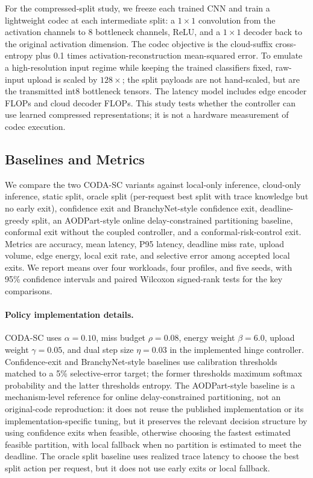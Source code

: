 \documentclass[11pt]{article}
\begin{document}
For the compressed-split study, we freeze each trained CNN and train a lightweight
codec at each intermediate split: a $1\times1$ convolution from the activation
channels to 8 bottleneck channels, ReLU, and a $1\times1$ decoder back to the
original activation dimension. The codec objective is the cloud-suffix
cross-entropy plus 0.1 times activation-reconstruction mean-squared error. To
emulate a high-resolution input regime while keeping the trained classifiers
fixed, raw-input upload is scaled by $128\times$; the split payloads are not
hand-scaled, but are the transmitted int8 bottleneck tensors. The latency model
includes edge encoder FLOPs and cloud decoder FLOPs. This study tests whether
the controller can use learned compressed representations; it is not a hardware
measurement of codec execution.

\subsection{Baselines and Metrics}

We compare the two CODA-SC variants against local-only inference, cloud-only
inference, static split, oracle split (per-request best split with trace
knowledge but no early exit), confidence exit and BranchyNet-style confidence
exit, deadline-greedy split, an AODPart-style online delay-constrained
partitioning baseline, conformal exit without the coupled controller, and a
conformal-risk-control exit. Metrics are accuracy, mean latency, P95 latency,
deadline miss rate, upload volume, edge energy, local exit rate, and selective
error among accepted local exits. We report means over four workloads, four
profiles, and five seeds, with 95\% confidence intervals and paired Wilcoxon
signed-rank tests for the key comparisons.

\paragraph{Policy implementation details.}
CODA-SC uses $\alpha=0.10$, miss budget $\rho=0.08$, energy weight
$\beta=6.0$, upload weight $\gamma=0.05$, and dual step size $\eta=0.03$ in the
implemented hinge controller. Confidence-exit and BranchyNet-style baselines
use calibration thresholds matched to a 5\% selective-error target; the former
thresholds maximum softmax probability and the latter thresholds entropy. The
AODPart-style baseline is a mechanism-level reference for online
delay-constrained partitioning, not an original-code reproduction: it does not
reuse the published implementation or its implementation-specific tuning, but it
preserves the relevant decision structure by using confidence exits when
feasible, otherwise choosing the fastest estimated feasible partition, with local
fallback when no partition is estimated to meet the deadline. The oracle split
baseline uses realized trace latency to choose the best split action per request,
but it does not use early exits or local fallback.
\end{document}
